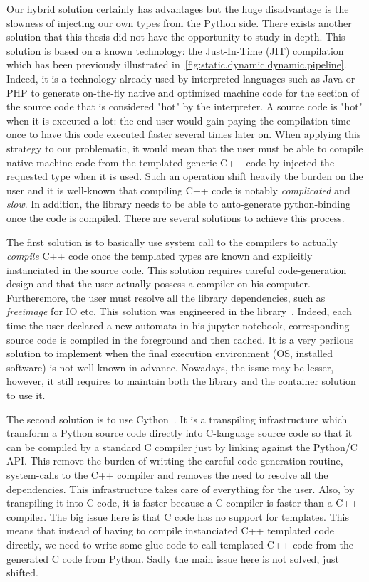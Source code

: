 Our hybrid solution certainly has advantages but the huge disadvantage is the slowness of injecting our own types from
the Python side. There exists another solution that this thesis did not have the opportunity to study in-depth. This
solution is based on a known technology: the Just-In-Time (JIT) compilation which has been previously illustrated
in~\cref{fig:static.dynamic.dynamic.pipeline}. Indeed, it is a technology already used by interpreted languages such as
Java or PHP to generate on-the-fly native and optimized machine code for the section of the source code that is
considered "hot" by the interpreter. A source code is "hot" when it is executed a lot: the end-user would gain paying
the compilation time once to have this code executed faster several times later on. When applying this strategy to our
problematic, it would mean that the user must be able to compile native machine code from the templated generic C++ code
by injected the requested type when it is used. Such an operation shift heavily the burden on the user and it is
well-known that compiling C++ code is notably \emph{complicated} and \emph{slow}. In addition, the library needs to be
able to auto-generate python-binding once the code is compiled. There are several solutions to achieve this process.

The first solution is to basically use system call to the compilers to actually \emph{compile} C++ code once the
templated types are known and explicitly instanciated in the source code. This solution requires careful code-generation
design and that the user actually possess a compiler on his computer. Furtheremore, the user must resolve all the
library dependencies, such as \emph{freeimage} for IO etc. This solution was engineered in the
library~\parencite{demaille.2013.vcsn}. Indeed, each time the user declared a new automata in his jupyter notebook,
corresponding source code is compiled in the foreground and then cached. It is a very perilous solution to implement
when the final execution environment (OS, installed software) is not well-known in advance. Nowadays, the issue may be
lesser, however, it still requires to maintain both the library and the container solution to use it.

The second solution is to use Cython~\parencite{behnel.2010.cython}. It is a transpiling infrastructure which transform
a Python source code directly into C-language source code so that it can be compiled by a standard C compiler just by
linking against the Python/C API. This remove the burden of writting the careful code-generation routine, system-calls
to the C++ compiler and removes the need to resolve all the dependencies. This infrastructure takes care of everything
for the user. Also, by transpiling it into C code, it is faster because a C compiler is faster than a C++ compiler. The
big issue here is that C code has no support for templates. This means that instead of having to compile instanciated
C++ templated code directly, we need to write some glue code to call templated C++ code from the generated C code from
Python. Sadly the main issue here is not solved, just shifted.

